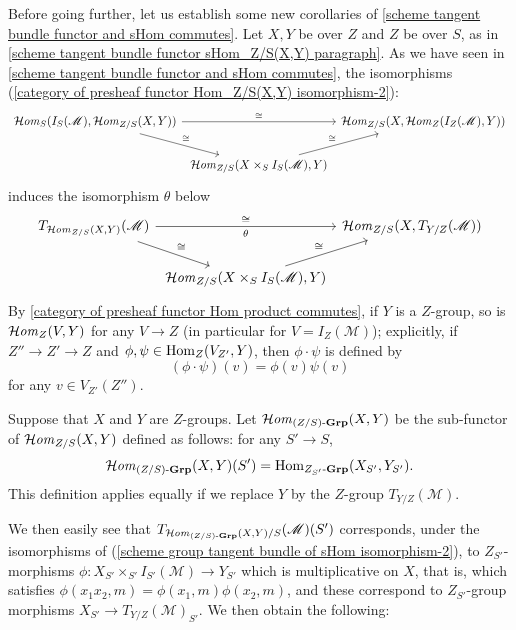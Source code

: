 Before going further, let us establish some new corollaries of \cref{scheme tangent bundle functor and sHom commutes}. Let $X,Y$ be over $Z$ and $Z$ be over $S$, as in \ref{scheme tangent bundle functor sHom_Z/S(X,Y) paragraph}. As we have seen in \cref{scheme tangent bundle functor and sHom commutes}, the isomorphisms (\ref{category of presheaf functor Hom_Z/S(X,Y) isomorphism-2}):
\begin{equation}\label{scheme group tangent bundle of sHom isomorphism-1}
\begin{tikzcd}[column sep=1mm]
\sHom_S(I_S(\mathscr{M}),\sHom_{Z/S}(X,Y))\ar[rd,"\cong"]\ar[rr,"\cong"]&&\sHom_{Z/S}(X,\sHom_Z(I_Z(\mathscr{M}),Y))\\
&\sHom_{Z/S}(X\times_SI_S(\mathscr{M}),Y)\ar[ru,"\cong"]
\end{tikzcd}
\end{equation}
induces the isomorphism $\theta$ below
\begin{equation}\label{scheme group tangent bundle of sHom isomorphism-2}
\begin{tikzcd}[column sep=1mm]
T_{\sHom_{Z/S}(X,Y)}(\mathscr{M})\ar[rd,"\cong"]\ar[rr,"\cong","\theta"']&&\sHom_{Z/S}(X,T_{Y/Z}(\mathscr{M}))\\
&\sHom_{Z/S}(X\times_SI_S(\mathscr{M}),Y)\ar[ru,"\cong"]
\end{tikzcd}
\end{equation}
By \cref{category of presheaf functor Hom product commutes}, if $Y$ is a $Z$-group, so is $\operatorname{\mathcal{H}\hspace*{-0.4pt}\textit{om}\hspace{0.5pt}}_Z(V,Y)$ for any $V\to Z$ (in particular for $V=I_Z(\mathscr{M})$); explicitly, if $Z''\to Z'\to Z$ and $\phi,\psi\in\mathrm{Hom}_Z(V_{Z'},Y)$, then $\phi\cdot\psi$ is defined by
\[(\phi\cdot\psi)(v)=\phi(v)\psi(v)\]
for any $v\in V_{Z'}(Z'')$.

\begin{definition}
Suppose that $X$ and $Y$ are $Z$-groups. Let $\operatorname{\mathcal{H}\hspace*{-0.4pt}\textit{om}\hspace{0.5pt}}_{(Z/S)\textup{-}\mathbf{Grp}}(X,Y)$ be the sub-functor of $\operatorname{\mathcal{H}\hspace*{-0.4pt}\textit{om}\hspace{0.5pt}}_{Z/S}(X,Y)$ defined as follows: for any $S'\to S$,
\begin{equation}\label{scheme group tangent bundle of sHom isomorphism-3}
\operatorname{\mathcal{H}\hspace*{-0.4pt}\textit{om}\hspace{0.5pt}}_{(Z/S)\textup{-}\mathbf{Grp}}(X,Y)(S')=\mathrm{Hom}_{Z_{S'}\textup{-}\mathbf{Grp}}(X_{S'},Y_{S'}).
\end{equation}
This definition applies equally if we replace $Y$ by the $Z$-group $T_{Y/Z}(\mathscr{M})$.
\end{definition}

We then easily see that $T_{\operatorname{\mathcal{H}\hspace*{-0.4pt}\textit{om}\hspace{0.5pt}}_{(Z/S)\textup{-}\mathbf{Grp}}(X,Y)/S}(\mathscr{M})(S')$ corresponds, under the isomorphisms of (\ref{scheme group tangent bundle of sHom isomorphism-2}), to $Z_{S'}$-morphisms $\phi:X_{S'}\times_{S'}I_{S'}(\mathscr{M})\to Y_{S'}$ which is multiplicative on $X$, that is, which satisfies $\phi(x_1x_2,m)=\phi(x_1,m)\phi(x_2,m)$, and these correspond to $Z_{S'}$-group morphisms $X_{S'}\to T_{Y/Z}(\mathscr{M})_{S'}$. We then obtain the following:

